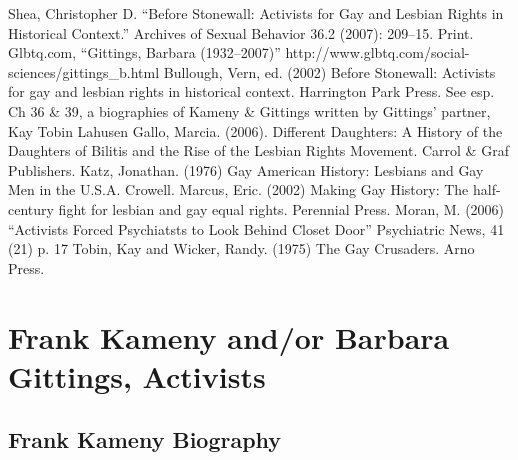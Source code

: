 Shea, Christopher D. ``Before Stonewall: Activists for Gay and Lesbian Rights in Historical Context.'' Archives of Sexual Behavior 36.2 (2007): 209--15. Print.
Glbtq.com, “Gittings, Barbara (1932--2007)” http:\slash \slash www.glbtq.com\slash social-sciences\slash gittings\_b.html
Bullough, Vern, ed. (2002) Before Stonewall: Activists for gay and lesbian rights in historical context. Harrington Park Press. See esp. Ch 36 \& 39, a biographies of Kameny \& Gittings written by Gittings' partner, Kay Tobin Lahusen
Gallo, Marcia. (2006). Different Daughters: A History of the Daughters of Bilitis and the Rise of the Lesbian Rights Movement. Carrol \& Graf Publishers.
Katz, Jonathan. (1976) Gay American History: Lesbians and Gay Men in the U.S.A. Crowell.
Marcus, Eric. (2002) Making Gay History: The half-century fight for lesbian and gay equal rights. Perennial Press.
Moran, M. (2006) “Activists Forced Psychiatsts to Look Behind Closet Door” Psychiatric News, 41 (21) p. 17
Tobin, Kay and Wicker, Randy. (1975) The Gay Crusaders. Arno Press.

\chapter{Frank Kameny and\slash or Barbara Gittings, Activists}
\label{frankkamenyandorbarbaragittingsactivists}

\section{Frank Kameny Biography}
\label{frankkamenybiography}

